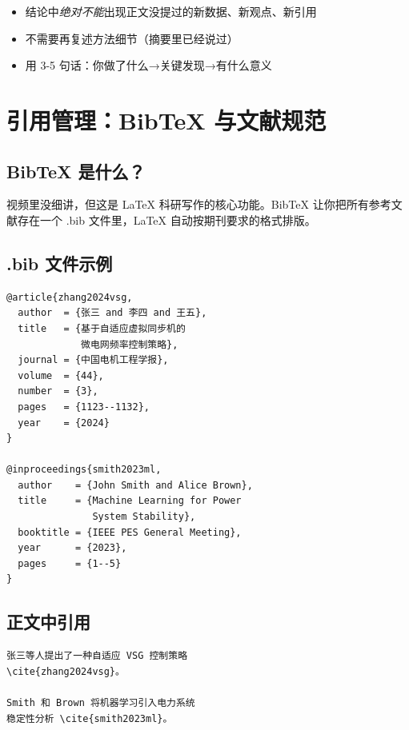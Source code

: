 \documentclass[12pt,a4paper]{ctexart}
\begin{document}
\begin{itemize}
    \item 结论中\emph{绝对不能}出现正文没提过的新数据、新观点、新引用
    \item 不需要再复述方法细节（摘要里已经说过）
    \item 用 3-5 句话：你做了什么→关键发现→有什么意义
\end{itemize}


\section{引用管理：BibTeX 与文献规范}

\subsection*{BibTeX 是什么？}

视频里没细讲，但这是 LaTeX 科研写作的核心功能。BibTeX 让你把所有参考文献存在一个 .bib 文件里，LaTeX 自动按期刊要求的格式排版。

\subsection*{.bib 文件示例}

\begin{tcolorbox}[colback=gray!5!white, colframe=gray!50!black, title=references.bib 示例]
\begin{verbatim}
@article{zhang2024vsg,
  author  = {张三 and 李四 and 王五},
  title   = {基于自适应虚拟同步机的
             微电网频率控制策略},
  journal = {中国电机工程学报},
  volume  = {44},
  number  = {3},
  pages   = {1123--1132},
  year    = {2024}
}

@inproceedings{smith2023ml,
  author    = {John Smith and Alice Brown},
  title     = {Machine Learning for Power
               System Stability},
  booktitle = {IEEE PES General Meeting},
  year      = {2023},
  pages     = {1--5}
}
\end{verbatim}
\end{tcolorbox}

\subsection*{正文中引用}

\begin{tcolorbox}[colback=gray!5!white, colframe=gray!50!black, title=引用命令]
\begin{verbatim}
张三等人提出了一种自适应 VSG 控制策略
\cite{zhang2024vsg}。

Smith 和 Brown 将机器学习引入电力系统
稳定性分析 \cite{smith2023ml}。
\end{verbatim}
\end{tcolorbox}
\end{document}
